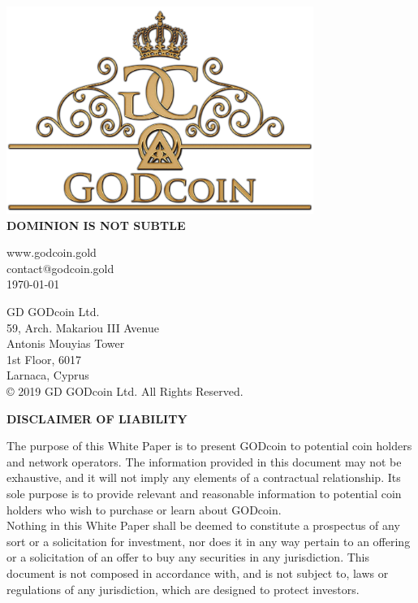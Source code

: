 \documentclass[12pt,a4paper]{article}
\begin{document}
  \begin{center}
    \includegraphics[width=100mm]{logo.png}\\
    \Large{\textbf{DOMINION IS NOT SUBTLE}}\\
    \vspace{3mm}

    \vspace{3mm}
    \normalsize{www.godcoin.gold}\\
    \normalsize{contact@godcoin.gold}\\
    \normalsize{\today}
    \vspace{5mm}

    \normalsize{GD GODcoin Ltd.}\\
    \normalsize{59, Arch. Makariou III Avenue}\\
    \normalsize{Antonis Mouyias Tower}\\
    \normalsize{1st Floor, 6017}\\
    \normalsize{Larnaca, Cyprus}\\

    \vspace*{\fill}
    \normalsize{© 2019 GD GODcoin Ltd. All Rights Reserved.}
  \end{center}

  \newpage
  \begin{center}
    \textbf{DISCLAIMER OF LIABILITY}
  \end{center}
  The purpose of this White Paper is to present GODcoin to potential coin
  holders and network operators. The information provided in this document may
  not be exhaustive, and it will not imply any elements of a contractual
  relationship. Its sole purpose is to provide relevant and reasonable
  information to potential coin holders who wish to purchase or learn about
  GODcoin.\\

  Nothing in this White Paper shall be deemed to constitute a prospectus of any
  sort or a solicitation for investment, nor does it in any way pertain to an
  offering or a solicitation of an offer to buy any securities in any
  jurisdiction. This document is not composed in accordance with, and is not
  subject to, laws or regulations of any jurisdiction, which are designed to
  protect investors.\\
\end{document}
